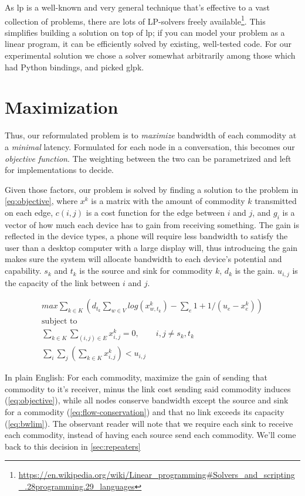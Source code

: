 As \gls{lp} is a well-known and very general technique that's effective to a vast collection of problems, there are lots of LP-solvers freely available\footnote{\url{https://en.wikipedia.org/wiki/Linear_programming\#Solvers_and_scripting_.28programming.29_languages}}. This simplifies building a solution on top of \gls{lp}; if you can model your problem as a linear program, it can be efficiently solved by existing, well-tested code. For our experimental solution we chose a solver somewhat arbitrarily among those which had Python bindings, and picked \gls{glpk}.


\section{Maximization}

Thus, our reformulated problem is to \emph{maximize} bandwidth of each commodity at a \emph{minimal} latency. Formulated for each node in a conversation, this becomes our \emph{objective function}. The weighting between the two can be parametrized and left for implementations to decide.

Given those factors, our problem is solved by finding a solution to the problem in \autoref{eq:objective}, where $x^k$ is a matrix with the amount of commodity $k$ transmitted on each edge, $c(i, j)$ is a cost function for the edge between $i$ and $j$, and $g_i$ is a vector of how much each device has to gain from receiving something. The gain is reflected in the device types, a phone will require less bandwidth to satisfy the user than a desktop computer with a large display will, thus introducing the gain makes sure the system will allocate bandwidth to each device's potential and capability. $s_k$ and $t_k$ is the source and sink for commodity $k$, $d_k$ is the gain. $u_{i, j}$ is the capacity of the link between $i$ and $j$.

\begin{gather}\label{eq:objective}
    max \sum_{k \in K} (d_{t_k} \sum_{w \in V} log(x_{w, t_k}^k) - \sum_e 1 + 1/(u_e - x_e^k))\\
    \text{subject to} \nonumber \\
    \sum_{k \in K} \sum_{(i, j) \in E} x_{i, j}^k = 0, \qquad{} i, j \neq s_k, t_k \label{eq:flow-conservation} \\
    \sum_i \sum_j (\sum_{k \in K}x_{i, j}^k) < u_{i, j} \label{eq:bwlim}
\end{gather}


In plain English: For each commodity, maximize the gain of sending that commodity to it's receiver, minus the link cost sending said commodity induces (\autoref{eq:objective}), while all nodes conserve bandwidth except the source and sink for a commodity (\autoref{eq:flow-conservation}) and that no link exceeds its capacity (\autoref{eq:bwlim}). The observant reader will note that we require each sink to receive each commodity, instead of having each source send each commodity. We'll come back to this decision in \autoref{sec:repeaters}

